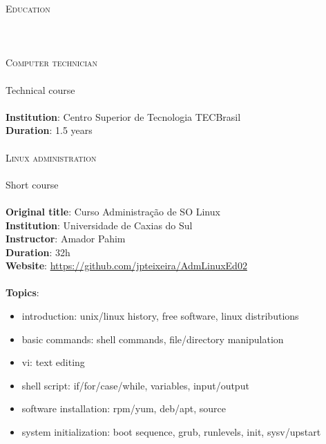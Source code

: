 \noindent
\textsc{\Huge Education} \\\\\\\\
\noindent
\textsc{\Large Computer technician} \\\\
Technical course \\\\
\textbf{Institution}: Centro Superior de Tecnologia TECBrasil \\
\textbf{Duration}: 1.5 years \\\\

\noindent
\textsc{\Large Linux administration} \\\\
Short course \\\\
\textbf{Original title}: Curso Administração de SO Linux \\
\textbf{Institution}: Universidade de Caxias do Sul \\
\textbf{Instructor}: Amador Pahim \\
\textbf{Duration}: 32h \\
\textbf{Website}: \url{https://github.com/jpteixeira/AdmLinuxEd02} \\\\
\textbf{Topics}:
    \begin{itemize}
        \vspace{-2.5mm}
        \itemsep-1mm
        \item introduction: unix/linux history, free software, linux
            distributions
        \item basic commands: shell commands, file/directory manipulation
        \item vi: text editing
        \item shell script: if/for/case/while, variables, input/output
        \item software installation: rpm/yum, deb/apt, source
        \item system initialization: boot sequence, grub, runlevels, init,
            sysv/upstart
    \end{itemize}
\vspace{5mm}

